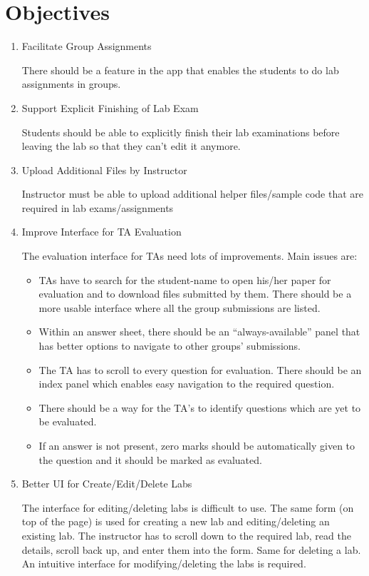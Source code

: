 \section{Objectives}
\begin{enumerate}
\item Facilitate Group Assignments

There should be a feature in the app that enables the students to do lab assignments in groups.

\item Support Explicit Finishing of Lab Exam

Students should be able to explicitly finish their lab examinations before leaving the lab so that they can't edit it anymore.

\item Upload Additional Files by Instructor

Instructor must be able to upload additional helper files/sample code that are required in lab exams/assignments

\item Improve Interface for TA Evaluation

The evaluation interface for TAs need lots of improvements. Main issues are:
	\begin{itemize}
	\item TAs have to search for the student-name to open his/her paper for evaluation and to download files submitted by them. There should be a more usable interface where all the group submissions are listed.
	\item Within an answer sheet, there should be an ``always-available'' panel that has better options to navigate to other groups' submissions. %
	\item The TA has to scroll to every question for evaluation. There should be an index panel which enables easy navigation to the required question.
	\item There should be a way for the TA's to identify questions which are yet to be evaluated.
	\item If an answer is not present, zero marks should be automatically given to the question and it should be marked as evaluated.
	\end{itemize}

\item Better UI for Create/Edit/Delete Labs

The interface for editing/deleting labs is difficult to use. The same form (on top of the page) is used for creating a new lab and editing/deleting an existing lab. The instructor has to scroll down to the required lab, read the details, scroll back up, and enter them into the form. Same for deleting a lab. An intuitive interface for modifying/deleting the labs is required.


\end{enumerate}
